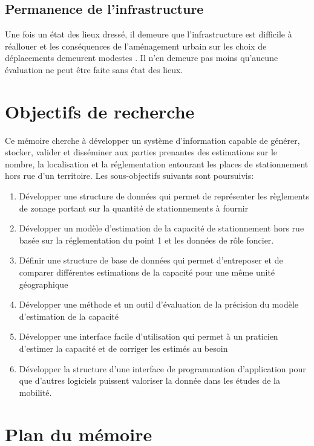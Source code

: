 \subsection{Permanence de l'infrastructure}
Une fois un état des lieux dressé, il demeure que l'infrastructure est difficile à réallouer et les conséquences de l'aménagement urbain sur les choix de déplacements demeurent modestes \parencite{stevens_does_2017,manville_travel_2017}. Il n'en demeure pas moins qu'aucune évaluation ne peut être faite sans état des lieux.



\section{Objectifs de recherche}  \label{sec:obj_recherche}%
Ce mémoire cherche à développer un système d'information capable de générer, stocker, valider et disséminer aux parties prenantes des estimations sur le nombre, la localisation et la réglementation entourant les places de stationnement hors rue d'un territoire. Les sous-objectifs suivants sont poursuivis:

\begin{enumerate}
\item Développer une structure de données qui permet de représenter les règlements de zonage portant sur la quantité de stationnements à fournir
\item Développer un modèle d'estimation de la capacité de stationnement hors rue basée sur la réglementation du point 1 et les données de rôle foncier.
\item Définir une structure de base de données qui permet d'entreposer et de comparer différentes estimations de la capacité pour une même unité géographique
\item Développer une méthode et un outil d'évaluation de la précision du modèle d'estimation de la capacité
\item Développer une interface facile d'utilisation qui permet à un praticien d'estimer la capacité et de corriger les estimés au besoin
\item Développer la structure d'une interface de programmation d'application pour que d'autres logiciels puissent valoriser la donnée dans les études de la mobilité.
\end{enumerate}

\section{Plan du mémoire}  %

